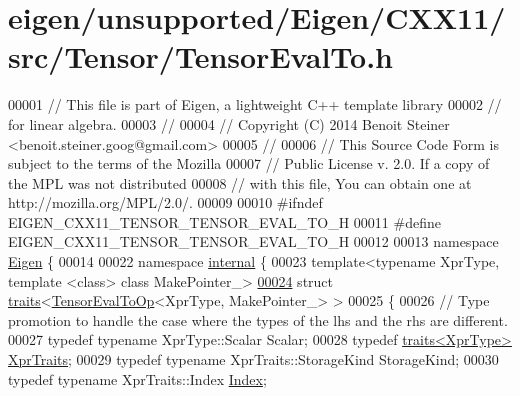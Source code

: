 \hypertarget{eigen_2unsupported_2_eigen_2_c_x_x11_2src_2_tensor_2_tensor_eval_to_8h_source}{}\section{eigen/unsupported/\+Eigen/\+C\+X\+X11/src/\+Tensor/\+Tensor\+Eval\+To.h}
\label{eigen_2unsupported_2_eigen_2_c_x_x11_2src_2_tensor_2_tensor_eval_to_8h_source}

\begin{DoxyCode}
00001 \textcolor{comment}{// This file is part of Eigen, a lightweight C++ template library}
00002 \textcolor{comment}{// for linear algebra.}
00003 \textcolor{comment}{//}
00004 \textcolor{comment}{// Copyright (C) 2014 Benoit Steiner <benoit.steiner.goog@gmail.com>}
00005 \textcolor{comment}{//}
00006 \textcolor{comment}{// This Source Code Form is subject to the terms of the Mozilla}
00007 \textcolor{comment}{// Public License v. 2.0. If a copy of the MPL was not distributed}
00008 \textcolor{comment}{// with this file, You can obtain one at http://mozilla.org/MPL/2.0/.}
00009 
00010 \textcolor{preprocessor}{#ifndef EIGEN\_CXX11\_TENSOR\_TENSOR\_EVAL\_TO\_H}
00011 \textcolor{preprocessor}{#define EIGEN\_CXX11\_TENSOR\_TENSOR\_EVAL\_TO\_H}
00012 
00013 \textcolor{keyword}{namespace }\hyperlink{namespace_eigen}{Eigen} \{
00014 
00022 \textcolor{keyword}{namespace }\hyperlink{namespaceinternal}{internal} \{
00023 \textcolor{keyword}{template}<\textcolor{keyword}{typename} XprType, \textcolor{keyword}{template} <\textcolor{keyword}{class}> \textcolor{keyword}{class }MakePointer\_>
\hyperlink{struct_eigen_1_1internal_1_1traits_3_01_tensor_eval_to_op_3_01_xpr_type_00_01_make_pointer___01_4_01_4}{00024} \textcolor{keyword}{struct }\hyperlink{struct_eigen_1_1internal_1_1traits}{traits}<\hyperlink{class_eigen_1_1_tensor_eval_to_op}{TensorEvalToOp}<XprType, MakePointer\_> >
00025 \{
00026   \textcolor{comment}{// Type promotion to handle the case where the types of the lhs and the rhs are different.}
00027   \textcolor{keyword}{typedef} \textcolor{keyword}{typename} XprType::Scalar Scalar;
00028   \textcolor{keyword}{typedef} \hyperlink{struct_eigen_1_1internal_1_1traits}{traits<XprType>} \hyperlink{struct_eigen_1_1internal_1_1traits}{XprTraits};
00029   \textcolor{keyword}{typedef} \textcolor{keyword}{typename} XprTraits::StorageKind StorageKind;
00030   \textcolor{keyword}{typedef} \textcolor{keyword}{typename} XprTraits::Index \hyperlink{namespace_eigen_a62e77e0933482dafde8fe197d9a2cfde}{Index};

\end{DoxyCode}
